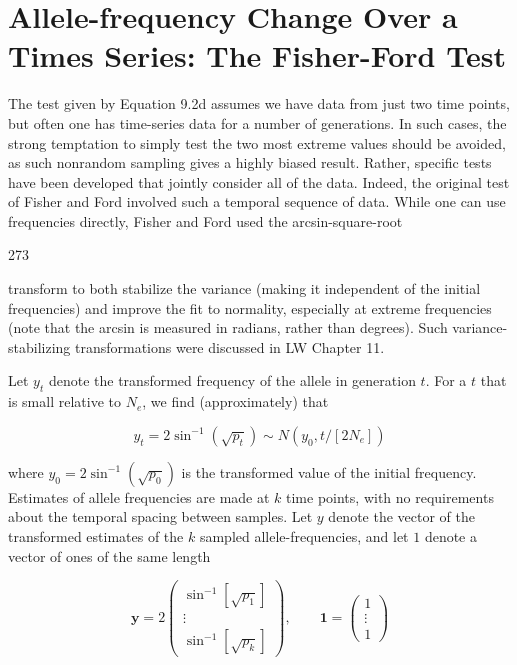 \documentclass{article}
\begin{document}
\section{Allele-frequency Change Over a Times Series: The Fisher-Ford Test}
The test given by Equation 9.2d assumes we have data from just two time points, but often one has time-series data for a number of generations. In such cases, the strong temptation to simply test the two most extreme values should be avoided, as such nonrandom sampling gives a highly biased result. Rather, specific tests have been developed that jointly consider all of the data. Indeed, the original test of Fisher and Ford involved such a temporal sequence of data. While one can use frequencies directly, Fisher and Ford used the arcsin-square-root

273

transform to both stabilize the variance (making it independent of the initial frequencies) and improve the fit to normality, especially at extreme frequencies (note that the arcsin is measured in radians, rather than degrees). Such variance-stabilizing transformations were discussed in LW Chapter 11.

Let  $ y_t $ denote the transformed frequency of the allele in generation  $ t $. For a  $ t $ that is small relative to  $ N_e $, we find (approximately) that

\begin{equation}
y_{t}=2\sin^{-1}\left(\sqrt{p_{t}}\right)\sim N\left(y_{0},t/[2N_{e}]\right)
\tag{9.5a}
\label{eq:9_5a}
\end{equation}

where  $ y_0 = 2\sin^{-1}\left(\sqrt{p_0}\right) $ is the transformed value of the initial frequency. Estimates of allele frequencies are made at  $ k $ time points, with no requirements about the temporal spacing between samples. Let  $ y $ denote the vector of the transformed estimates of the  $ k $ sampled allele-frequencies, and let  $ 1 $ denote a vector of ones of the same length

\begin{equation}
\mathbf{y}=2\begin{pmatrix}\sin^{-1}\left[\sqrt{p_{1}}\right]\\ \vdots\\ \sin^{-1}\left[\sqrt{p_{k}}\right]\end{pmatrix},\qquad\mathbf{1}=\begin{pmatrix}1\\ \vdots\\ 1\end{pmatrix}
\tag{9.5b}
\label{eq:9_5b}
\end{equation}
\end{document}
